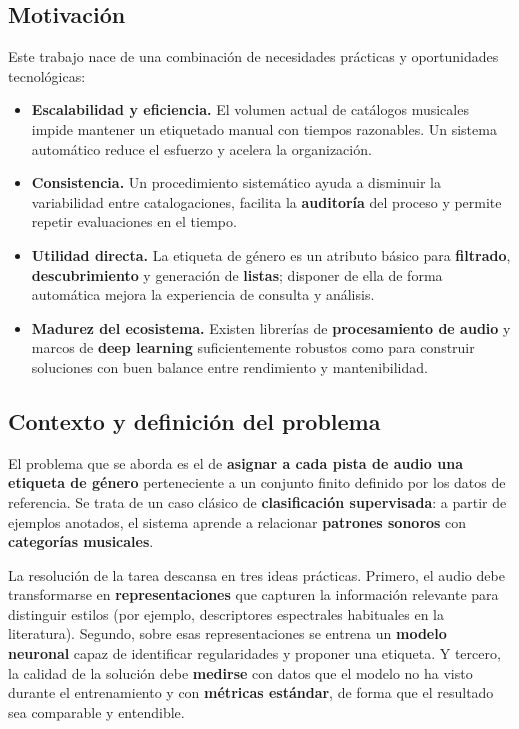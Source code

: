 \documentclass[12pt,twoside]{article}
\begin{document}
\subsection{Motivación}

Este trabajo nace de una combinación de necesidades prácticas y oportunidades tecnológicas:

\begin{itemize}
  \item \textbf{Escalabilidad y eficiencia.} El volumen actual de catálogos musicales impide mantener un etiquetado manual con tiempos razonables. Un sistema automático reduce el esfuerzo y acelera la organización.
  \item \textbf{Consistencia.} Un procedimiento sistemático ayuda a disminuir la variabilidad entre catalogaciones, facilita la \textbf{auditoría} del proceso y permite repetir evaluaciones en el tiempo.
  \item \textbf{Utilidad directa.} La etiqueta de género es un atributo básico para \textbf{filtrado}, \textbf{descubrimiento} y generación de \textbf{listas}; disponer de ella de forma automática mejora la experiencia de consulta y análisis.
  \item \textbf{Madurez del ecosistema.} Existen librerías de \textbf{procesamiento de audio} y marcos de \textbf{deep learning} suficientemente robustos como para construir soluciones con buen balance entre rendimiento y mantenibilidad.
\end{itemize}

\subsection{Contexto y definición del problema}

El problema que se aborda es el de \textbf{asignar a cada pista de audio una etiqueta de género} perteneciente a un conjunto finito definido por los datos de referencia. Se trata de un caso clásico de \textbf{clasificación supervisada}: a partir de ejemplos anotados, el sistema aprende a relacionar \textbf{patrones sonoros} con \textbf{categorías musicales}.

La resolución de la tarea descansa en tres ideas prácticas. Primero, el audio debe transformarse en \textbf{representaciones} que capturen la información relevante para distinguir estilos (por ejemplo, descriptores espectrales habituales en la literatura). Segundo, sobre esas representaciones se entrena un \textbf{modelo neuronal} capaz de identificar regularidades y proponer una etiqueta. Y tercero, la calidad de la solución debe \textbf{medirse} con datos que el modelo no ha visto durante el entrenamiento y con \textbf{métricas estándar}, de forma que el resultado sea comparable y entendible.
\end{document}
